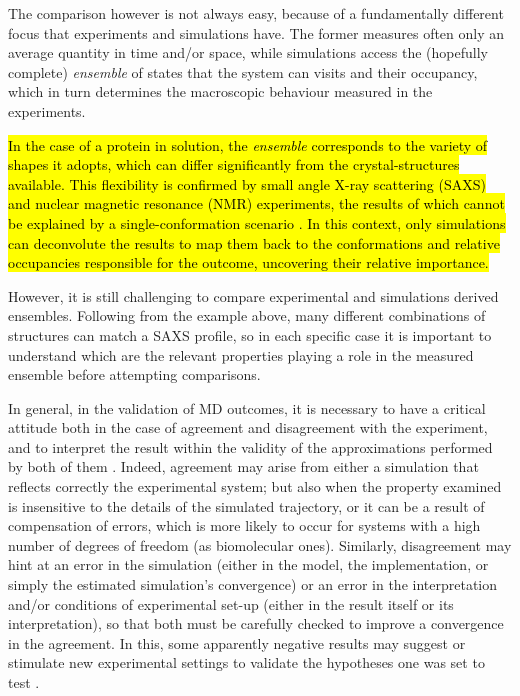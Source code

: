 The comparison however is not always easy, because of a fundamentally different focus that experiments and simulations have. The former measures often only an average quantity in time and/or space, while simulations access the (hopefully complete) \emph{ensemble} of states that the system can visits and their occupancy, which in turn determines the macroscopic behaviour measured in the experiments.

\hl{In the case of a protein in solution, the \emph{ensemble} corresponds to the variety of shapes it adopts, which can differ significantly from the crystal-structures available. This flexibility is confirmed by small angle X-ray scattering (SAXS) and nuclear magnetic resonance (NMR) experiments, the results of which cannot be explained by a single-conformation scenario \cite{Bonomi2017,Kikhney2015,Kleckner2011}. In this context, only simulations can deconvolute the results to map them back to the conformations and relative occupancies responsible for the outcome, uncovering their relative importance.}

However, it is still challenging to compare experimental and simulations derived ensembles. Following from the example above, many different combinations of structures can match a SAXS profile, so in each specific case it is important to understand which are the relevant properties playing a role in the measured ensemble before attempting comparisons.

In general, in the validation of MD outcomes, it is necessary to have a critical attitude both in the case of agreement and disagreement with the experiment, and to interpret the result within the validity of the approximations performed by both of them \cite{VanGunsteren2008}.
%
Indeed, agreement may arise from either a simulation that reflects correctly the experimental system; but also when the property examined is insensitive to the details of the simulated trajectory, or it can be a result of compensation of errors, which is more likely to occur for systems with a high number of degrees of freedom (as biomolecular ones).
%
Similarly, disagreement may hint at an error in the simulation (either in the model, the implementation, or simply the estimated simulation's convergence) or an error in the interpretation and/or conditions of experimental set-up (either in the result itself or its interpretation), so that both must be carefully checked to improve a convergence in the agreement.
%
In this, some apparently negative results may suggest or stimulate new experimental settings to validate the hypotheses one was set to test \cite{Goncalves2013,Meissner2014}.

